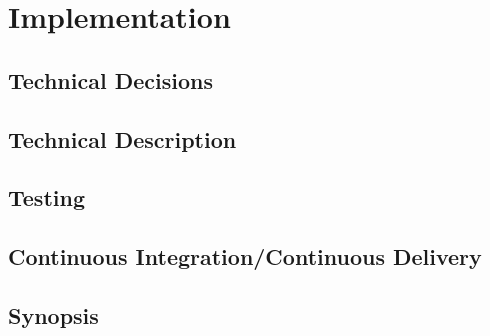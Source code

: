 \chapter{Implementation}
\label{chap:implementation}

\section{Technical Decisions}
\label{sec:implementation:decisions}

\section{Technical Description}
\label{sec:implementation:description}

\section{Testing}
\label{sec:implementation:testing}

\section{Continuous Integration/Continuous Delivery}
\label{sec:implementation:cicd}

\section{Synopsis}
\label{sec:implementation:synopsis}
